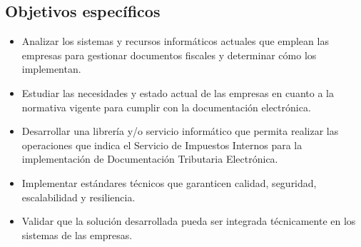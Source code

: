 \subsection{Objetivos específicos}
\begin{itemize}
	\item Analizar los sistemas y recursos informáticos actuales que emplean las empresas para gestionar documentos fiscales y determinar cómo los implementan.
	\item Estudiar las necesidades y estado actual de las empresas en cuanto a la normativa vigente para cumplir con la documentación electrónica.
	\item Desarrollar una librería y/o servicio informático que permita realizar las operaciones que indica el Servicio de Impuestos Internos para la implementación de Documentación Tributaria Electrónica.
	\item Implementar estándares técnicos que garanticen calidad, seguridad, escalabilidad y resiliencia.
	\item Validar que la solución desarrollada pueda ser integrada técnicamente en los sistemas de las empresas.
\end{itemize}